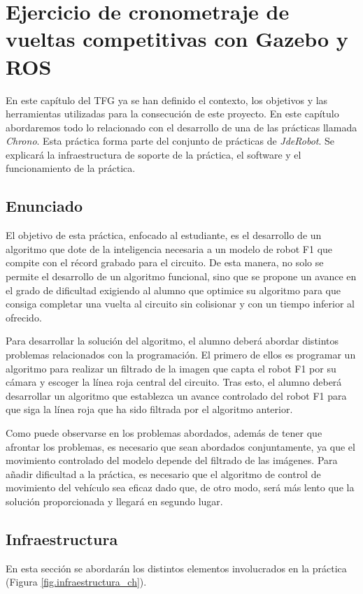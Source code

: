 \chapter{Ejercicio de cronometraje de vueltas competitivas con Gazebo y ROS}\label{cap.chrono}
En este capítulo del TFG ya se han definido el contexto, los objetivos y las herramientas utilizadas para la consecución de este proyecto. En este capítulo abordaremos todo lo relacionado con el desarrollo de una de las prácticas llamada \textit{Chrono}. Esta práctica forma parte del conjunto de prácticas de \textit{JdeRobot}. Se explicará la infraestructura de soporte de la práctica, el software y el funcionamiento de la práctica.

\section{Enunciado}\label{sec.enunciado}
El objetivo de esta práctica, enfocado al estudiante, es el desarrollo de un algoritmo que dote de la inteligencia necesaria a un modelo de robot F1 que compite con el récord grabado para el circuito. De esta manera, no solo se permite el desarrollo de un algoritmo funcional, sino que se propone un avance en el grado de dificultad exigiendo al alumno que optimice su algoritmo para que consiga completar una vuelta al circuito sin colisionar y con un tiempo inferior al ofrecido.

Para desarrollar la solución del algoritmo, el alumno deberá abordar distintos problemas relacionados con la programación. El primero de ellos es programar un algoritmo para realizar un filtrado de la imagen que capta el robot F1 por su cámara y escoger la línea roja central del circuito. Tras esto, el alumno deberá desarrollar un algoritmo que establezca un avance controlado del robot F1 para que siga la línea roja que ha sido filtrada por el algoritmo anterior.

Como puede observarse en los problemas abordados, además de tener que afrontar los problemas, es necesario que sean abordados conjuntamente, ya que el movimiento controlado del modelo depende del filtrado de las imágenes. Para añadir dificultad a la práctica, es necesario que el algoritmo de control de movimiento del vehículo sea eficaz dado que, de otro modo, será más lento que la solución proporcionada y llegará en segundo lugar.

\section{Infraestructura}
En esta sección se abordarán los distintos elementos involucrados en la práctica (Figura \ref{fig.infraestructura_ch}).

